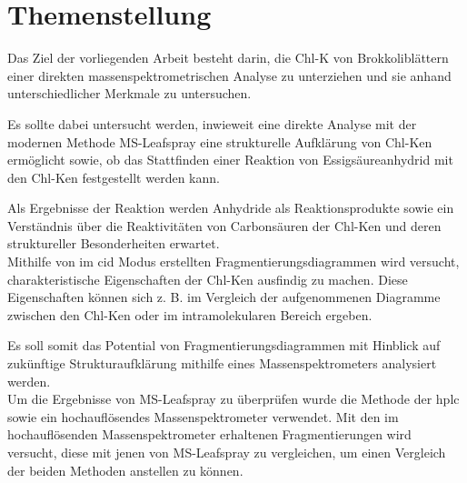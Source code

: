 \chapter{Themenstellung} \label{sec:Themenstellung}

Das Ziel der vorliegenden Arbeit besteht darin, die \gls{Chl-K} von Brokkoliblättern einer direkten massenspektrometrischen Analyse zu unterziehen und sie anhand unterschiedlicher Merkmale zu untersuchen.

Es sollte dabei untersucht werden, inwieweit eine direkte Analyse mit der modernen Methode MS-Leafspray eine strukturelle Aufklärung von \gls{Chl-K}en ermöglicht sowie, ob das Stattfinden einer Reaktion von Essigsäureanhydrid mit den \gls{Chl-K}en festgestellt werden kann. 

Als Ergebnisse der Reaktion werden Anhydride als Reaktionsprodukte sowie ein Verständnis über die Reaktivitäten von Carbonsäuren der \gls{Chl-K}en und deren struktureller Besonderheiten erwartet.\\

Mithilfe von im \gls{cid} Modus erstellten Fragmentierungsdiagrammen wird versucht, charakteristische Eigenschaften der \gls{Chl-K}en ausfindig zu machen. Diese Eigenschaften können sich z. B. im Vergleich der aufgenommenen Diagramme zwischen den \gls{Chl-K}en oder im intramolekularen Bereich ergeben. 

Es soll somit das Potential von Fragmentierungsdiagrammen mit Hinblick auf zukünftige Strukturaufklärung mithilfe eines Massenspektrometers analysiert werden. \\

Um die Ergebnisse von MS-Leafspray zu überprüfen wurde die Methode der \gls{hplc} sowie ein hochauflösendes Massenspektrometer verwendet. Mit den im hochauflösenden Massenspektrometer erhaltenen Fragmentierungen wird versucht, diese mit jenen von MS-Leafspray zu vergleichen, um einen Vergleich der beiden Methoden anstellen zu können.





